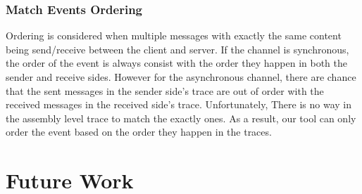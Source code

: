\documentclass[paper=a4, fontsize=11pt]{scrartcl}
\numberwithin{equation}{section}		%
\numberwithin{figure}{section}			%
\numberwithin{table}{section}				%
\begin{document}
\subsubsection{Match Events Ordering}
Ordering is considered when multiple messages with exactly the same content being send/receive between the client and server. If the channel is synchronous, the order of the event is always consist with the order they happen in both the sender and receive sides. However for the asynchronous channel, there are chance that the sent messages in the sender side's trace are out of order with the received messages in the received side's trace. Unfortunately, There is no way in the assembly level trace to match the exactly ones. As a result, our tool can only order the event based on the order they happen in the traces.
\section{Future Work}



 


\end{document}
